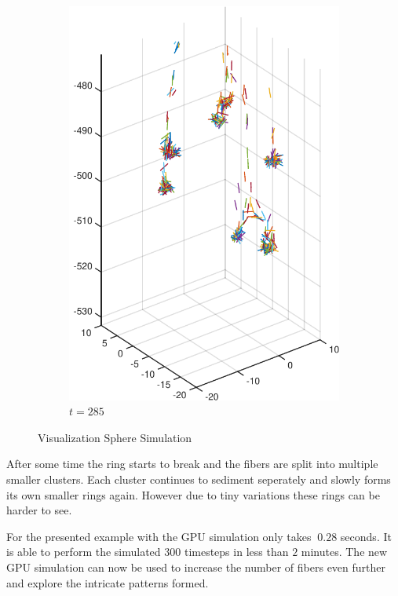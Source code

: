 \documentclass[a4paper,11pt]{kth-mag}
\begin{document}
\begin{figure}[!htbp]
\begin{subfigure}[h]{0.45\textwidth}
    \includegraphics[width=\textwidth]{img/sphere_00250.pdf}
    \caption{$t=285$}\label{fig:sphere_simulation_1d}
  \end{subfigure}
  \caption{Visualization Sphere Simulation}
  \label{fig:sphere_simulation}
\end{figure}

After some time the ring starts to break and the fibers are split into multiple smaller clusters. Each cluster continues to sediment seperately and slowly forms its own smaller rings again. However due to tiny variations these rings can be harder to see.

For the presented example with the GPU simulation only takes $~0.28$ seconds. It is able to perform the simulated $300$ timesteps in less than $2$ minutes. The new GPU simulation can now be used to increase the number of fibers even further and explore the intricate patterns formed.
\end{document}

